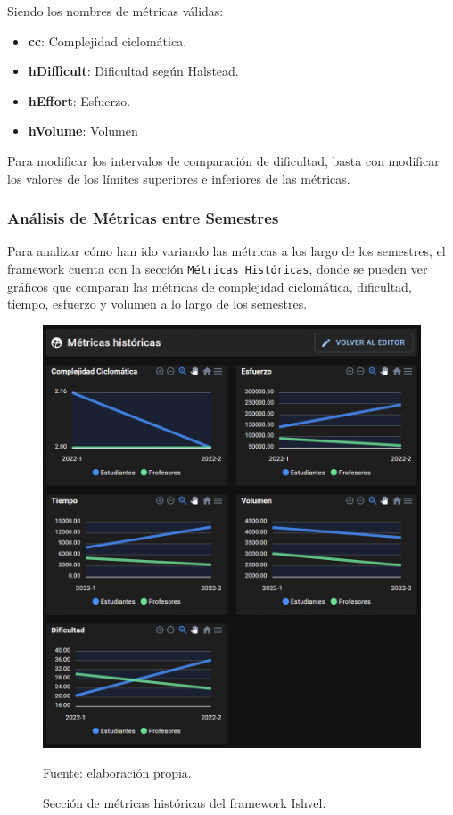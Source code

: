 \documentclass[letterpaper,12pt]{article}
\begin{document}
Siendo los nombres de métricas válidas:
\begin{itemize}
  \item \textbf{cc}: Complejidad ciclomática.
  \item \textbf{hDifficult}: Dificultad según Halstead.
  \item \textbf{hEffort}: Esfuerzo.
  \item \textbf{hVolume}: Volumen
\end{itemize}
Para modificar los intervalos de comparación de dificultad, basta con modificar los valores de los límites superiores e inferiores de las métricas.

\subsubsection{Análisis de Métricas entre Semestres}

Para analizar cómo han ido variando las métricas a los largo de los semestres, el framework cuenta con la sección \texttt{Métricas Históricas}, donde se pueden ver gráficos que comparan las métricas de complejidad ciclomática, dificultad, tiempo, esfuerzo y volumen a lo largo de los semestres.
\begin{figure}[H]
  \centering
  \includegraphics[width=1\textwidth]{figures/ishvel7.png}
  \caption{Sección de métricas históricas del framework Ishvel.} Fuente: elaboración propia.
  \label{img:ishvel7}
\end{figure}
\end{document}
